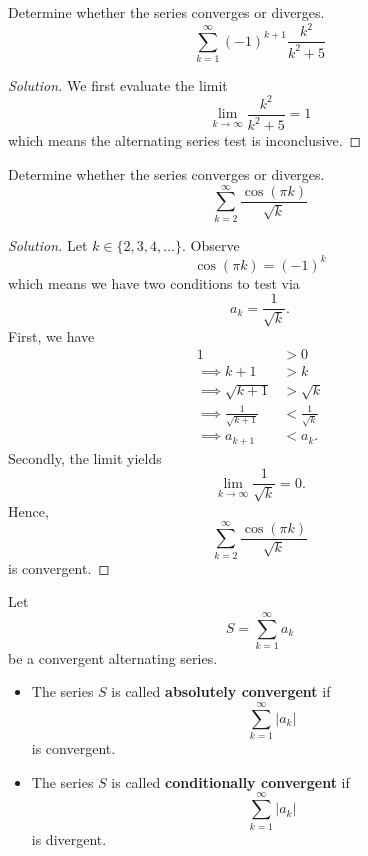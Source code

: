 \documentclass[compacto,10pt,comentarios]{aleph-notas}
\begin{document}
\begin{ejer}
    Determine whether the series converges or diverges.
    $$
        \sum_{k=1}^{\infty} (-1)^{k+1} \frac{k^2}{k^2 + 5}
    $$
\end{ejer}
\begin{proof}[Solution]
    We first evaluate the limit
    $$
        \lim_{k \to \infty} \frac{k^2}{k^2 + 5} = 1
    $$
    which means the alternating series test is inconclusive.
\end{proof}

\begin{ejer}
    Determine whether the series converges or diverges.
    $$
        \sum_{k=2}^{\infty} \frac{\cos(\pi k)}{\sqrt{k}}
    $$
\end{ejer}
\begin{proof}[Solution]
    Let $k \in \{2, 3, 4, \ldots \}$. Observe
    $$
        \cos(\pi k) = (-1)^{k}
    $$
    which means we have two conditions to test via
    $$
        a_k = \frac{1}{\sqrt{k}}.
    $$
    First, we have
    \begin{align*}
        1 & > 0 \\
        \implies k + 1 & > k \\
        \implies \sqrt{k+1} & > \sqrt{k} \\
        \implies \frac{1}{\sqrt{k+1}} & < \frac{1}{\sqrt{k}} \\
        \implies a_{k+1} & < a_{k}.
    \end{align*}
    Secondly, the limit yields
    $$
        \lim_{k \to \infty} \frac{1}{\sqrt{k}} = 0.
    $$
    Hence, 
    $$
        \sum_{k=2}^{\infty} \frac{\cos(\pi k)}{\sqrt{k}}
    $$
    is convergent.
\end{proof}

\begin{defi}
    Let
    $$
        S = \sum_{k=1}^{\infty} a_k
    $$
    be a convergent alternating series.
    \begin{itemize}
        \item The series $S$ is called \textbf{absolutely convergent} if
        $$
            \sum_{k=1}^{\infty} |a_k|
        $$
        is convergent.
        \item The series $S$ is called \textbf{conditionally convergent} if
        $$
            \sum_{k=1}^{\infty} |a_k|
        $$
        is divergent.
    \end{itemize}
\end{defi}
\end{document}

